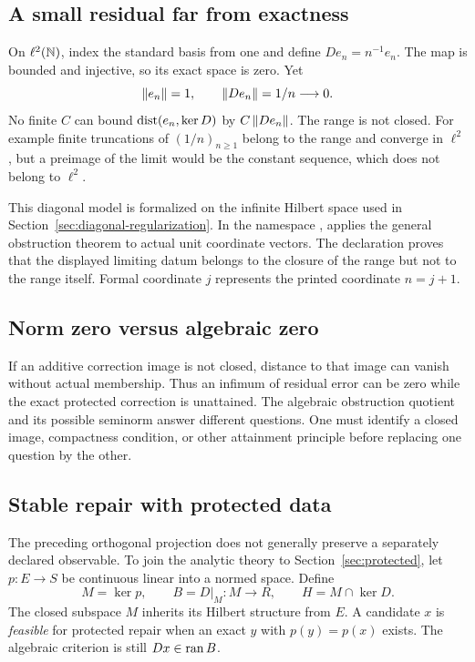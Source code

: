 \subsection{A small residual far from exactness}
On \(\ell^2(\mathbb N)\), index the standard basis from one and define \(De_n=n^{-1}e_n\). The map is bounded and injective, so its exact space is zero. Yet
\[
 \left\lVert e_n\right\rVert=1,\qquad\left\lVert De_n\right\rVert=1/n\longrightarrow0.
\]
No finite \(C\) can bound \(\operatorname{dist}(e_n,\ker D)\) by \(C\left\lVert De_n\right\rVert\). The range is not closed. For example finite truncations of \((1/n)_{n\ge1}\) belong to the range and converge in \(\ell^2\), but a preimage of the limit would be the constant sequence, which does not belong to \(\ell^2\).

This diagonal model is formalized on the infinite Hilbert space used in Section~\ref{sec:diagonal-regularization}. In the namespace ,  applies the general obstruction theorem to actual unit coordinate vectors. The declaration  proves that the displayed limiting datum belongs to the closure of the range but not to the range itself. Formal coordinate $j$ represents the printed coordinate $n=j+1$.


\subsection{Norm zero versus algebraic zero}
If an additive correction image is not closed, distance to that image can vanish without actual membership. Thus an infimum of residual error can be zero while the exact protected correction is unattained. The algebraic obstruction quotient and its possible seminorm answer different questions. One must identify a closed image, compactness condition, or other attainment principle before replacing one question by the other.

\subsection{Stable repair with protected data}
The preceding orthogonal projection does not generally preserve a separately declared observable. To join the analytic theory to Section~\ref{sec:protected}, let \(p:E\to S\) be continuous linear into a normed space. Define
\[
 M=\ker p,\qquad B=D|_M:M\to R,\qquad H=M\cap\ker D.
\]
The closed subspace \(M\) inherits its Hilbert structure from \(E\). A candidate \(x\) is \emph{feasible} for protected repair when an exact \(y\) with \(p(y)=p(x)\) exists. The algebraic criterion is still \(Dx\in\operatorname{ran} B\).


